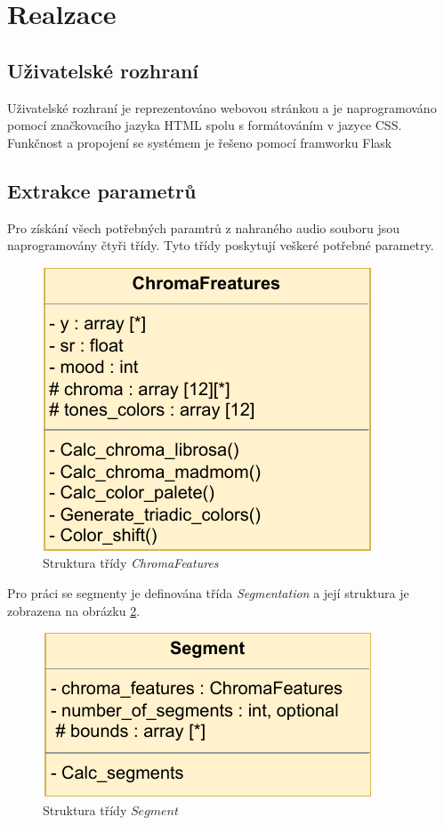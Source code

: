 \section{Realzace} \label{sec:Realizacr}

\subsection{Uživatelské rozhraní}

Uživatelské rozhraní je reprezentováno webovou stránkou a je naprogramováno pomocí značkovacího jazyka \acs{HTML} spolu s formátováním v jazyce CSS.
Funkčnost a propojení se systémem je řešeno pomocí framworku Flask 

\subsection{Extrakce parametrů} \label{sec:Parameter_extraction}
Pro získání všech potřebných paramtrů z nahraného audio souboru jsou naprogramovány čtyři třídy. Tyto třídy poskytují veškeré potřebné parametry.

\begin{figure}[H]
    \centering
        \includegraphics[width = 0.3\linewidth]{obrazky/UML_diagram_ChromaFeatures.pdf}
        \caption{Struktura třídy \textit{ChromaFeatures}}
        \label{fig:ChromaFeatures_class_diagram}
    \end{figure}


Pro práci se segmenty je definována třída \textit{Segmentation} a její struktura je zobrazena na obrázku \ref{fig:Segmentation_diagram}.

\begin{figure}[H]
    \centering
    \includegraphics[width = 0.3\linewidth]{obrazky/UML_diagram_Segmentation.pdf}
    \caption{Struktura třídy $Segment$}
    \label{fig:Segmentation_diagram}
\end{figure}

